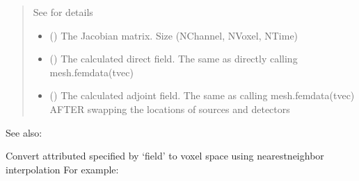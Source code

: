 \documentclass[letterpaper,10pt,english]{sphinxmanual}
\begin{document}
\begin{fulllineitems}
\begin{fulllineitems}
\begin{quote}
\begin{description}
\begin{itemize}
\sphinxAtStartPar
See {\hyperref[\detokenize{_autosummary/nirfasterff.utils.SolverOptions:nirfasterff.utils.SolverOptions}]{}} for details


\end{itemize}

\sphinxAtStartPar
\begin{itemize}
\item {} 
\sphinxAtStartPar
{} () \textendash{} The Jacobian matrix. Size (NChannel, NVoxel, NTime)

\item {} 
\sphinxAtStartPar
{} () \textendash{} The calculated direct field. The same as directly calling mesh.femdata(tvec)

\item {} 
\sphinxAtStartPar
{} () \textendash{} The calculated adjoint field. The same as calling mesh.femdata(tvec) AFTER swapping the locations of sources and detectors

\end{itemize}


\end{description}\end{quote}


\begin{sphinxseealso}{See also:}

\sphinxAtStartPar
{\hyperref[\detokenize{_autosummary/nirfasterff.inverse.jacobian_DCS:nirfasterff.inverse.jacobian_DCS}]{}}


\end{sphinxseealso}


\end{fulllineitems}


\begin{fulllineitems}
\label{\detokenize{_autosummary/nirfasterff.base.dcs_mesh.dcsmesh:nirfasterff.base.dcs_mesh.dcsmesh.nntogrid}}
\pysigstartsignatures
\pysiglinewithargsret
{}
{}
{}
\pysigstopsignatures
\sphinxAtStartPar
Convert attributed specified by ‘field’ to voxel space using nearest\sphinxhyphen{}neighbor interpolation
For example:
\begin{quote}


\end{quote}
\end{fulllineitems}
\end{fulllineitems}
\end{document}
